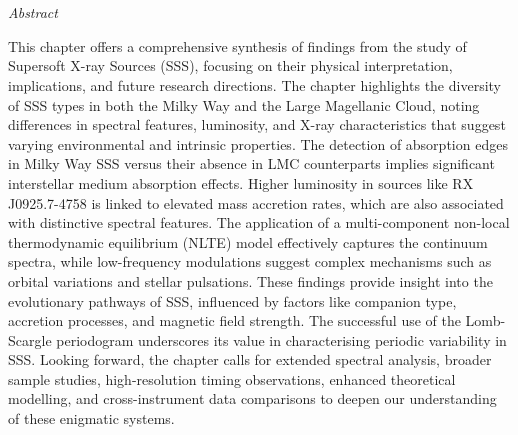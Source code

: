 \def\baselinestretch{1}
\chapter{\MakeUppercase{\ChapterTitleSeven}} \label{chap:conclusion}
    \minitoc
    
    \newpage
    \begin{center}
    	\emph{Abstract}
    \end{center}
    This chapter offers a comprehensive synthesis of findings from the study of Supersoft X-ray Sources (SSS), focusing on their physical interpretation, implications, and future research directions. The chapter highlights the diversity of SSS types in both the Milky Way and the Large Magellanic Cloud, noting differences in spectral features, luminosity, and X-ray characteristics that suggest varying environmental and intrinsic properties. The detection of absorption edges in Milky Way SSS versus their absence in LMC counterparts implies significant interstellar medium absorption effects. Higher luminosity in sources like RX J0925.7-4758 is linked to elevated mass accretion rates, which are also associated with distinctive spectral features. The application of a multi-component non-local thermodynamic equilibrium (NLTE) model effectively captures the continuum spectra, while low-frequency modulations suggest complex mechanisms such as orbital variations and stellar pulsations. These findings provide insight into the evolutionary pathways of SSS, influenced by factors like companion type, accretion processes, and magnetic field strength. The successful use of the Lomb-Scargle periodogram underscores its value in characterising periodic variability in SSS. Looking forward, the chapter calls for extended spectral analysis, broader sample studies, high-resolution timing observations, enhanced theoretical modelling, and cross-instrument data comparisons to deepen our understanding of these enigmatic systems.
    
    \setcounter{footnote}{\value{footnotecount}}

    \newpage
